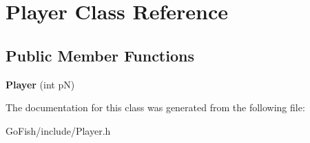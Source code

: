 \hypertarget{class_player}{\section{Player Class Reference}
\label{class_player}
}
\subsection*{Public Member Functions}
\begin{DoxyCompactItemize}
\item 
\hypertarget{class_player_a80d1293f6f49b886db318f1dae7be23b}{{\bfseries Player} (int p\-N)}\label{class_player_a80d1293f6f49b886db318f1dae7be23b}

\end{DoxyCompactItemize}


The documentation for this class was generated from the following file\-:\begin{DoxyCompactItemize}
\item 
Go\-Fish/include/Player.\-h\end{DoxyCompactItemize}
